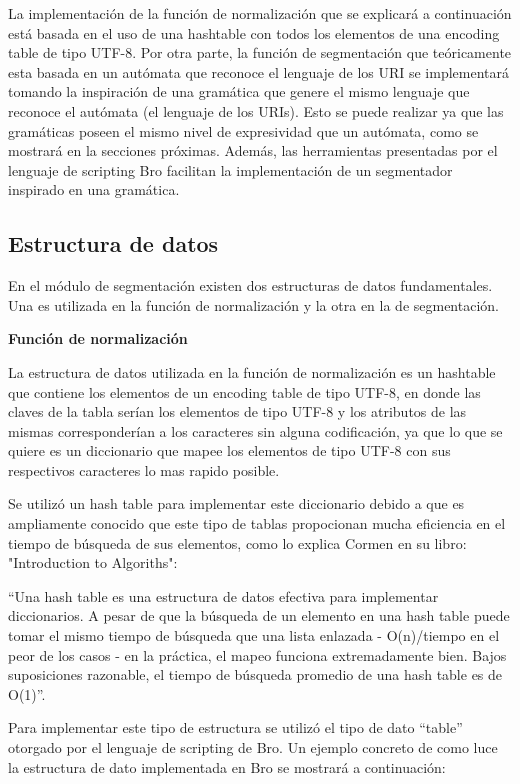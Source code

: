 La implementación de la función de normalización que se explicará a continuación está basada en el uso de una hashtable con todos los elementos de una encoding table de tipo UTF-8. Por otra parte, la función de segmentación que teóricamente esta basada en un autómata que reconoce el lenguaje de los URI se implementará tomando la inspiración de una gramática que genere el mismo lenguaje que reconoce el autómata (el lenguaje de los URIs). Esto se puede realizar ya que las gramáticas poseen el mismo nivel de expresividad que un autómata, como se mostrará en la secciones próximas. Además, las herramientas presentadas por el lenguaje de scripting Bro facilitan la implementación de un segmentador inspirado en una gramática.

\subsection{Estructura de datos}
En el módulo de segmentación existen dos estructuras de datos fundamentales. Una es utilizada en la función de normalización y la otra en la de segmentación.

\textbf{Función de normalización}

La estructura de datos utilizada en la función de normalización es un hashtable que contiene los elementos de un encoding table de tipo UTF-8, en donde las claves de la tabla serían los elementos de tipo UTF-8 y los atributos de las mismas corresponderían a los caracteres sin alguna codificación, ya que lo que se quiere es un diccionario que mapee los elementos de tipo UTF-8 con sus respectivos caracteres lo mas rapido posible.

Se utilizó un hash table para implementar este diccionario debido a que es ampliamente conocido que este tipo de tablas propocionan mucha eficiencia en el tiempo de búsqueda de sus elementos, como lo explica Cormen en su libro: "Introduction to Algoriths":

“Una hash table es una estructura de datos efectiva para implementar diccionarios. A pesar de que la búsqueda de un elemento en una hash table puede tomar el mismo tiempo de búsqueda que una lista enlazada - O(n)/tiempo en el peor de los casos - en la práctica, el mapeo funciona extremadamente bien.  Bajos suposiciones razonable, el tiempo de búsqueda promedio de una hash table es de O(1)”.

Para implementar este tipo de estructura se utilizó el tipo de dato “table” otorgado por el lenguaje de scripting de Bro. Un ejemplo concreto de como luce la estructura de dato implementada en Bro se mostrará a continuación:

